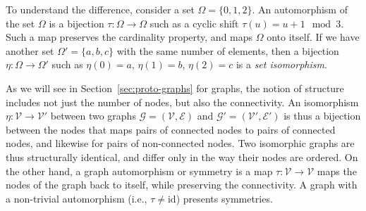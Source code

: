 To understand the difference, consider a set $\Omega = \{0,1,2\}$.
An automorphism of the set $\Omega$ is a bijection $\tau : \Omega \rightarrow \Omega$ such as a cyclic shift $\tau(u) = u + 1 \mod 3$.
Such a map preserves the cardinality property, and maps $\Omega$ onto itself.
If we have another set $\Omega' = \{a, b, c\}$ with the same number of elements, then a bijection $\eta : \Omega \rightarrow \Omega'$ such as $\eta(0) = a$, $\eta(1) = b$, $\eta(2) = c$ is a {\em set isomorphism}.

As we will see in Section~\ref{sec:proto-graphs}
for graphs, %
the notion of structure includes not just the number of nodes, but also the connectivity.
An isomorphism $\eta: \mathcal{V} \rightarrow \mathcal{V}'$ between two graphs $\mathcal{G}=(\mathcal{V},\mathcal{E})$ and $\mathcal{G}'=(\mathcal{V}',\mathcal{E}')$ is thus a bijection between the nodes that maps pairs of connected nodes to pairs of connected nodes, and likewise for pairs of non-connected nodes. Two isomorphic graphs are thus structurally identical, and differ only in the way their nodes are ordered. 
%
On the other hand, a graph automorphism or symmetry is a map $\tau : \mathcal{V} \rightarrow \mathcal{V}$ maps the nodes of the graph back to itself, while preserving the connectivity. A graph with a non-trivial automorphism (i.e., $\tau \neq \mathrm{id}$) presents symmetries.

